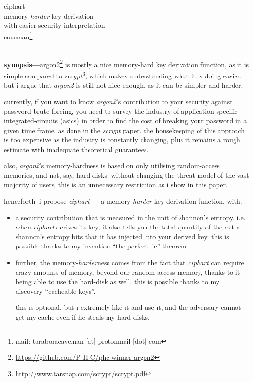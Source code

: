\documentclass[twocolumn]{article}
\begin{document}
\SetInd{.15em}{1em}

\begin{center}
\Huge
ciphart\\
\LARGE
memory-\emph{harder} key derivation \\
with easier security interpretation\\
\normalsize
caveman\footnote{mail: toraboracaveman [at] protonmail [dot] com}\\
\footnotesize
\DTMnow\\
\end{center}

\noindent\textbf{synopsis---}argon2\footnote{\url{https://github.com/P-H-C/phc-winner-argon2}}
is mostly a nice memory-hard key derivation function, as it is simple
compared to
\emph{scrypt}\footnote{\url{http://www.tarsnap.com/scrypt/scrypt.pdf}},
which makes understanding what it is doing easier.  but i argue that
\emph{argon2} is still not nice enough, as it can be simpler and harder.

currently, if you want to know \emph{argon2}'s contribution to your
security against password brute-forcing, you need to survey the industry of
application-specific integrated-circuits (asics) in order to find the cost
of breaking your password in a given time frame, as done in the
\emph{scrypt} paper.  the housekeeping of this approach is too expensive as
the industry is constantly changing, plus it remains a rough estimate with
inadequate theoretical guarantees.

also, \emph{argon2}'s memory-hardness is based on only utilising
random-access memories, and not, say, hard-disks.  without changing the
threat model of the vast majority of users, this is an unnecessary
restriction as i show in this paper.

henceforth, i propose \emph{ciphart} --- a memory-\emph{harder} key
derivation function, with:
\begin{itemize}
    \item a security contribution that is measured in the unit of shannon's
    entropy.  i.e. when \emph{ciphart} derives its key, it also tells you
    the total quantity of the extra shannon's entropy bits that it has
    injected into your derived key.  this is possible thanks to my
    invention ``the perfect lie'' theorem.
    \item further, the memory-\emph{harder}ness comes from the fact that
    \emph{ciphart} can require crazy amounts of memory, beyond our
    random-access memory, thanks to it being able to use the hard-disk as
    well.  this is possible thanks to my discovery ``cacheable keys''.

    this is optional, but i extremely like it and use it, and the adversary
    cannot get my cache even if he steals my hard-disks.
\end{itemize}
\end{document}
